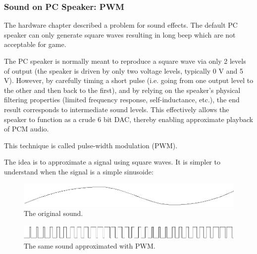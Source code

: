  
\subsubsection{Sound on PC Speaker: PWM}
The hardware chapter described a problem for sound effects. The default PC speaker can only generate square waves resulting in long beep which are not acceptable for game.\\

\par
 \begin{fancyquotes}
  The PC speaker is normally meant to reproduce a square wave via only 2 levels of output (the speaker is driven by only two voltage levels, typically 0 V and 5 V). However, by carefully timing a short pulse (i.e. going from one output level to the other and then back to the first), and by relying on the speaker's physical filtering properties (limited frequency response, self-inductance, etc.), the end result corresponds to intermediate sound levels. This effectively allows the speaker to function as a crude 6 bit DAC, thereby enabling approximate playback of PCM audio.\\
  \par
  This technique is called pulse-width modulation (PWM).
 \end{fancyquotes}
\par
  
The idea is to approximate a signal using square waves. It is simpler to understand when the signal is a simple sinusoide:
\par
\begin{figure}[H]
\centering
 \includegraphics[width=\textwidth]{imgs/drawings/pwm/sinuois.png}
 \caption{The original sound.}
 \end{figure}
\par

\par
\begin{figure}[H]
\centering
 \includegraphics[width=\textwidth]{imgs/drawings/pwm/pwm_approximation.png}
 \caption{The same sound approximated with PWM.}
 \end{figure}
\par


